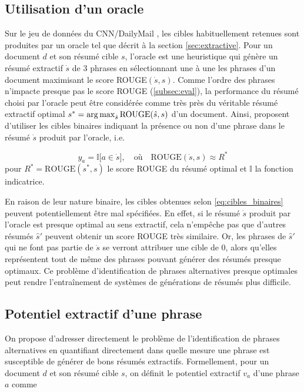 \subsection{Utilisation d'un oracle}
\label{subsec:ucb_oracle}

Sur le jeu de données du CNN/DailyMail \citep{hermann2015teaching},
les cibles habituellement retenues sont produites par un oracle tel que décrit 
à la section \ref{sec:extractive}.
Pour un document $d$ et son résumé cible $s$, l'oracle est une heuristique qui 
génère un résumé extractif $\dot{s}$ de 3 phrases en sélectionnant 
une à une les phrases d'un document maximisant le score 
ROUGE$(\dot{s}, s)$.
Comme l'ordre des phrases n'impacte presque pas le score ROUGE (\ref{subsec:eval}),
la performance du résumé choisi par l'oracle 
peut être considérée comme très près du véritable résumé 
extractif optimal $s^*=\operatorname*{arg\,max}_{\hat{s}} \text{ROUGE}(\hat{s}, s)$ d'un document.
Ainsi, \citet{10.5555/3298483.3298681} proposent d'utiliser 
les cibles binaires indiquant la présence ou non d'une phrase 
dans le résumé $\dot{s}$ produit par l'oracle, i.e.

\begin{equation}
    y_a = \mathbb{I}\big[a \in \dot{s}\big], \quad \text{où} \quad \text{ROUGE}(\dot{s}, s) \approx R^*
    \label{eq:cibles_binaires}
\end{equation}
pour $R^*= \text{ROUGE}(s^*, s)$ le score ROUGE du résumé optimal et
$\mathbb{I}$ la fonction indicatrice.

En raison de leur nature binaire, les cibles obtenues selon \eqref{eq:cibles_binaires}
peuvent potentiellement être mal spécifiées.
En effet, si le résumé $\dot{s}$ produit par l'oracle est 
presque optimal au sens extractif, cela n'empêche pas 
que d'autres résumés $\hat{s}'$ peuvent obtenir un score ROUGE
très similaire. 
Or, les phrases de $\hat{s}'$ qui ne font pas partie de $\dot{s}$
se verront attribuer une cible de 0, alors qu'elles représentent 
tout de même des phrases pouvant générer des résumés presque optimaux.
Ce problème d'identification de phrases alternatives
presque optimales peut rendre l'entraînement de systèmes 
de générations de résumés plus difficile.

\subsection{Potentiel extractif d'une phrase}

On propose d'adresser directement le problème de l'identification 
de phrases alternatives en quantifiant 
directement dans quelle mesure une phrase est susceptible de générer 
de bons résumés extractifs.
Formellement, pour un document $d$ et son résumé cible $s$, 
on définit le potentiel extractif $v_a$ d'une phrase $a$
comme

